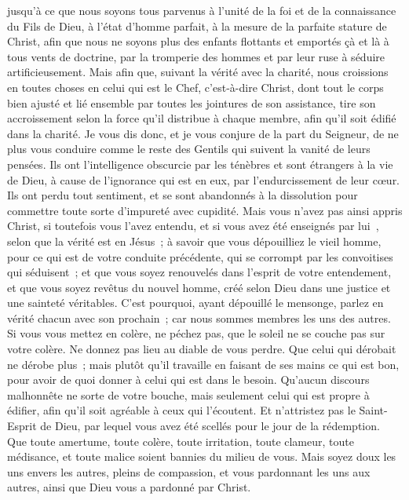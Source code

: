 \begin{multicols}{2}
jusqu'à ce que nous soyons tous parvenus à l'unité de la foi et de la connaissance du Fils de Dieu, à l'état d'homme parfait, à la mesure de la parfaite stature de Christ,
afin que nous ne soyons plus des enfants flottants et emportés çà et là à tous vents de doctrine, par la tromperie des hommes et par leur ruse à séduire artificieusement.
Mais afin que, suivant la vérité avec la charité, nous croissions en toutes choses en celui qui est le Chef, c'est-à-dire Christ,
dont tout le corps bien ajusté et lié ensemble par toutes les jointures de son assistance, tire son accroissement selon la force qu'il distribue à chaque membre, afin qu'il soit édifié dans la charité.
Je vous dis donc, et je vous conjure de la part du Seigneur, de ne plus vous conduire comme le reste des Gentils qui suivent la vanité de leurs pensées.
Ils ont l'intelligence obscurcie par les ténèbres et sont étrangers à la vie de Dieu, à cause de l'ignorance qui est en eux, par l'endurcissement de leur cœur.
Ils ont perdu tout sentiment, et se sont abandonnés à la dissolution pour commettre toute sorte d'impureté avec cupidité.
Mais vous n'avez pas ainsi appris Christ,
si toutefois vous l'avez entendu, et si vous avez été enseignés par lui~, selon que la vérité est en Jésus~;
à savoir que vous dépouilliez le vieil homme, pour ce qui est de votre conduite précédente, qui se corrompt par les convoitises qui séduisent~;
et que vous soyez renouvelés dans l'esprit de votre entendement,
et que vous soyez revêtus du nouvel homme, créé selon Dieu dans une justice et une sainteté véritables.
C'est pourquoi, ayant dépouillé le mensonge, parlez en vérité chacun avec son prochain~; car nous sommes membres les uns des autres.
Si vous vous mettez en colère, ne péchez pas, que le soleil ne se couche pas sur votre colère.
Ne donnez pas lieu au diable de vous perdre.
Que celui qui dérobait ne dérobe plus~; mais plutôt qu'il travaille en faisant de ses mains ce qui est bon, pour avoir de quoi donner à celui qui est dans le besoin.
Qu'aucun discours malhonnête ne sorte de votre bouche, mais seulement celui qui est propre à édifier, afin qu'il soit agréable à ceux qui l'écoutent.
Et n'attristez pas le Saint-Esprit de Dieu, par lequel vous avez été scellés pour le jour de la rédemption.
Que toute amertume, toute colère, toute irritation, toute clameur, toute médisance, et toute malice soient bannies du milieu de vous.
Mais soyez doux les uns envers les autres, pleins de compassion, et vous pardonnant les uns aux autres, ainsi que Dieu vous a pardonné par Christ.

\end{multicols}
